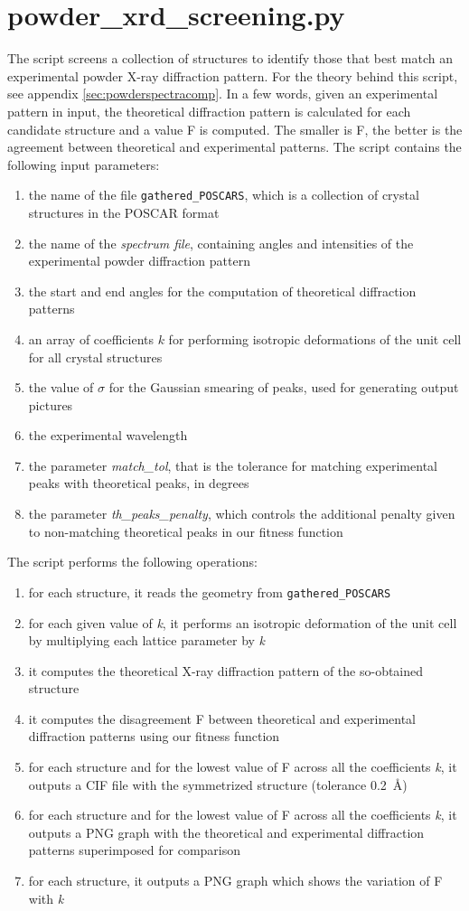 \documentclass{article}
\begin{document}
\section{powder\_xrd\_screening.py}
The script screens a collection of structures to identify those that best match an experimental powder X-ray diffraction pattern. For the theory behind this script, see appendix \ref{sec:powderspectracomp}. In a few words, given an experimental pattern in input, the theoretical diffraction pattern is calculated for each candidate structure and a value F is computed. The smaller is F, the better is the agreement between theoretical and experimental patterns. The script contains the following input parameters:
\begin{enumerate}
	\item the name of the file \texttt{gathered\_POSCARS}, which is a collection of crystal structures in the POSCAR format
	\item the name of the \emph{spectrum file}, containing angles and intensities of the experimental powder diffraction pattern
	\item the start and end angles for the computation of theoretical diffraction patterns
	\item an array of coefficients $k$ for performing isotropic deformations of the unit cell for all crystal structures
	\item the value of $\sigma$ for the Gaussian smearing of peaks, used for generating output pictures
	\item the experimental wavelength
	\item the parameter \emph{match\_tol}, that is the tolerance for matching experimental peaks with theoretical peaks, in degrees
	\item the parameter \emph{th\_peaks\_penalty}, which controls the additional penalty given to non-matching theoretical peaks in our fitness function
\end{enumerate}
The script performs the following operations:
\begin{enumerate}
	\item for each structure, it reads the geometry from \texttt{gathered\_POSCARS}
	\item for each given value of \emph{k}, it performs an isotropic deformation of the unit cell by multiplying each lattice parameter by \emph{k}
	\item it computes the theoretical X-ray diffraction pattern of the so-obtained structure
	\item it computes the disagreement F between theoretical and experimental diffraction patterns using our fitness function
	\item for each structure and for the lowest value of F across all the coefficients \emph{k}, it outputs a CIF file with the symmetrized structure (tolerance 0.2~\AA)
	\item for each structure and for the lowest value of F across all the coefficients \emph{k}, it outputs a PNG graph with the theoretical and experimental diffraction patterns superimposed for comparison
	\item for each structure, it outputs a PNG graph which shows the variation of F with \emph{k}
\end{enumerate}
\end{document}
